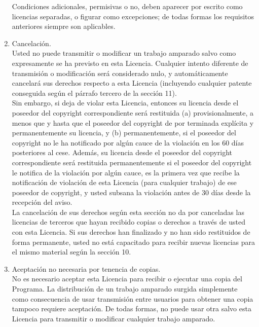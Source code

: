 \begin{enumerate}
		Condiciones adicionales, permisivas o no, deben aparecer por escrito como licencias separadas, o figurar como excepciones; de todas formas los requisitos anteriores siempre son aplicables.\\
		
		\item Cancelación.\\
		
		Usted no puede transmitir o modificar un trabajo amparado salvo como expresamente se ha previsto en esta Licencia. Cualquier intento diferente de transmisión o modificación será considerado nulo, y automáticamente cancelará sus derechos respecto a esta Licencia (incluyendo cualquier patente conseguida según el párrafo tercero de la sección 11).\\
		
		Sin embargo, si deja de violar esta Licencia, entonces su licencia desde el poseedor del copyright correspondiente será restituida (a) provisionalmente, a menos que y hasta que el poseedor del copyright de por terminada explícita y permanentemente su licencia, y (b) permanentemente, si el poseedor del copyright no le ha notificado por algún cauce de la violación en los 60 días posteriores al cese. Además, su licencia desde el poseedor del copyright correspondiente será restituida permanentemente si el poseedor del copyright le notifica de la violación por algún cauce, es la primera vez que recibe la notificación de violación de esta Licencia (para cualquier trabajo) de ese poseedor de copyright, y usted subsana la violación antes de 30 días desde la recepción del aviso.\\
		
		La cancelación de sus derechos según esta sección no da por canceladas las licencias de terceros que hayan recibido copias o derechos a través de usted con esta Licencia. Si sus derechos han finalizado y no han sido restituidos de forma permanente, usted no está capacitado para recibir nuevas licencias para el mismo material según la sección 10.\\
		
		\item Aceptación no necesaria por tenencia de copias.\\
		
		No es necesario aceptar esta Licencia para recibir o ejecutar una copia del Programa. La distribución de un trabajo amparado surgida simplemente como consecuencia de usar transmisión entre usuarios para obtener una copia tampoco requiere aceptación. De todas formas, no puede usar otra salvo esta Licencia para transmitir o modificar cualquier trabajo amparado.\\
		

\end{enumerate}
